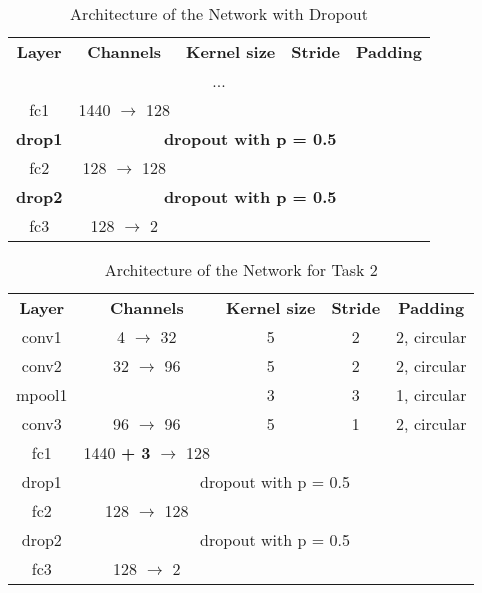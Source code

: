 \documentclass[conference]{IEEEtran}
\begin{document}
\begin{table}[htbp]
	\caption{Architecture of the Network with Dropout}
	\begin{center}
		\begin{tabular}{|c|c|c|c|c|}
			\hline
			\textbf{Layer}&\textbf{Channels} &\textbf{Kernel size} &\textbf{Stride} &\textbf{Padding}\\
			\cline{1-5}
			\multicolumn{5}{|c|}{...} \\ \hline
			fc1 &  1440 $\rightarrow$ 128 &  &  &  \\ \hline
			\bfseries drop1 & \multicolumn{4}{c|}{\bfseries dropout with p = 0.5} \\ \hline
			fc2 &  128 $\rightarrow$ 128 &  &  &  \\ \hline
			\bfseries drop2 & \multicolumn{4}{c|}{\bfseries dropout with p = 0.5} \\ \hline
			fc3 &  128 $\rightarrow$   2 &  &  &  \\ \hline
		\end{tabular}
		\label{tab: dropout + mpool}
	\end{center}
\end{table}



\begin{table}[htbp]
	\caption{Architecture of the Network for Task 2}
	\begin{center}
		\begin{tabular}{|c|c|c|c|c|}
			\hline
			\textbf{Layer}&\textbf{Channels} &\textbf{Kernel size} &\textbf{Stride} &\textbf{Padding}\\
			\cline{1-5}
			conv1  &  4 $\rightarrow$ 	32 & 5 & 2 & 2, circular \\ \hline
			conv2  & 32 $\rightarrow$  	96 & 5 & 2 & 2, circular \\ \hline
			mpool1 & 					   & 3	& 3 & 1, circular \\ 
			\hline			
			conv3  & 96 $\rightarrow$  	96 & 5 & 1 & 2, circular \\ \hline
			fc1   &  1440 \textbf{+ 3} $\rightarrow$ 128 &  &  &  \\ \hline
			drop1 & \multicolumn{4}{c|}{dropout with p = 0.5} \\ \hline
			fc2   &  128 $\rightarrow$ 128 &  &  &  \\ \hline
			 drop2 & \multicolumn{4}{c|}{ dropout with p = 0.5} \\ \hline
			fc3 &  128 $\rightarrow$   2 &  &  &  \\ \hline
		\end{tabular}
		\label{tab: task 2}
	\end{center}
\end{table}
\end{document}
